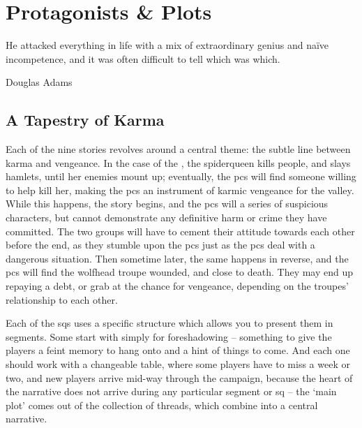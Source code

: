 \chapter{Protagonists \& Plots}
  \epigraph{He attacked everything in life with a mix of extraordinary genius and na\"ive incompetence, and it was often difficult to tell which was which.}{Douglas Adams}
\label{sideQuestIntro}

\section{A Tapestry of Karma}
\label{sqSummaries}

\begin{multicols}{2}


\noindent
Each of the nine stories revolves around a central theme: the subtle line between karma and vengeance.
In the case of the , the \gls{spiderqueen} kills people, and slays hamlets, until her enemies mount up; eventually, the \glspl{pc} will find someone willing to help kill her, making the \glspl{pc} an instrument of karmic vengeance for the \gls{valley}.
While this happens, the  story begins, and the \glspl{pc} will a series of suspicious characters, but cannot demonstrate any definitive harm or crime they have committed.
The two groups will have to cement their attitude towards each other before the end, as they stumble upon the \glspl{pc} just as the \glspl{pc} deal with a dangerous situation.
Then sometime later, the same happens in reverse, and the \glspl{pc} will find the \gls{wolfhead} troupe wounded, and close to death.
They may end up repaying a debt, or grab at the chance for vengeance, depending on the troupes' relationship to each other.


Each of the \glspl{sq} uses a specific structure which allows you to present them in \glspl{segment}.
Some start with  simply for foreshadowing -- something to give the players a feint memory to hang onto and a hint of things to come.
And each one should work with a changeable table, where some players have to miss a week or two, and new players arrive mid-way through the \gls{campaign}, because the heart of the narrative does not arrive during any particular \gls{segment} or \gls{sq} -- the `main plot' comes out of the collection of threads, which combine into a central narrative.



\end{multicols}
